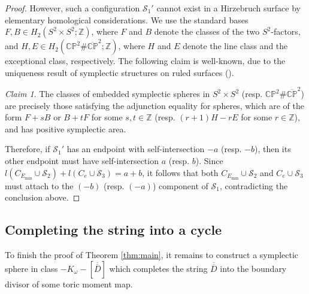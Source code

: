 \documentclass[11pt]{article}
\theoremstyle{definition}
\theoremstyle{remark}
\newtheorem{claim}[theorem]{Claim}
\newcommand{\CP}{\mathbb{CP}}
\newcommand{\st}{\mathcal{S}}
\begin{document}
\begin{proof}
However, such a configuration $\st_1'$ cannot exist in a Hirzebruch surface by elementary homological considerations. We use the standard bases $F,B\in H_2(S^2\times S^2;\mathbb{Z})$, where $F$ and $B$ denote the classes of the two $S^2$-factors, and $H,E\in H_2(\CP^2\#\overline{\CP}^2;\mathbb{Z})$, where $H$ and $E$ denote the line class and the exceptional class, respectively. The following claim is well-known, due to the uniqueness result of symplectic structures on ruled surfaces (\cite{lalondemcduff}).
\begin{claim}\label{claim:sphereinHirzebruch}
The classes of embedded symplectic spheres in $S^2\times S^2$ (resp. $\CP^2\#\overline{\CP}^2$) are precisely those satisfying the adjunction equality for spheres, which are of the form $F+sB$ or $B+tF$ for some $s,t\in\mathbb{Z}$ (resp. $(r+1)H-rE$ for some $r\in\mathbb{Z}$), and has positive symplectic area.
\end{claim}
Therefore, if $\st_1'$ has an endpoint with self-intersection $-a$ (resp. $-b$), then its other endpoint must have self-intersection $a$ (resp. $b$).
Since $l(C_{E_{\text{min}}}\cup \st_2)+l(C_e\cup \st_3)=a+b$, it follows that both $C_{E_{\text{min}}}\cup \st_2$ and $C_e\cup \st_3$ must attach to the $(-b)$ (resp. $(-a)$) component of $\st_1$, contradicting the conclusion above.
\end{proof}

\subsection{Completing the string into a cycle}\label{section:complete}
To finish the proof of Theorem \ref{thm:main}, it remains to construct a symplectic sphere in class $-K_\omega-[\overline{\overline{D}}]$ which completes the string $\overline{\overline{D}}$ into the boundary divisor of some toric moment map.
\end{document}
